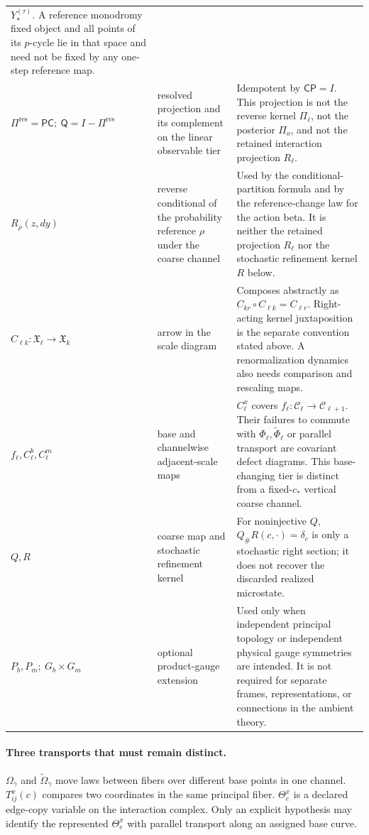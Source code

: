 \begin{longtable}{@{}>{\raggedright\arraybackslash}p{}
>{\raggedright\arraybackslash}p{}
>{\raggedright\arraybackslash}p{}@{}}
\(Y_\star^{(\tau)}\).  A reference monodromy fixed object and all points of
its \(p\)-cycle lie in that space and need not be fixed by any one-step
reference map. \\
\(\Pi^{\mathrm{res}}=\mathsf P\mathsf C;\ \mathsf Q=I-\Pi^{\mathrm{res}}\) &
resolved projection and its complement on the linear observable tier &
Idempotent by \(\mathsf C\mathsf P=I\).  This projection is not the reverse
kernel \(\Pi_\ell\), not the posterior \(\Pi_o\), and not the retained
interaction projection \(R_\ell\). \\
\(R_\rho(z,dy)\) &
reverse conditional of the probability reference \(\rho\) under the coarse
channel &
Used by the conditional-partition formula and by the reference-change law for
the action beta.  It is neither the retained projection \(R_\ell\) nor the
stochastic refinement kernel \(R\) below. \\
\(C_{\ell k}:\mathfrak X_\ell\to\mathfrak X_k\) &
arrow in the scale diagram &
Composes abstractly as \(C_{kr}\circ C_{\ell k}=C_{\ell r}\).  Right-acting
kernel juxtaposition is the separate convention stated above.  A renormalization dynamics
also needs comparison and rescaling maps. \\
\(f_\ell,C_\ell^b,C_\ell^m\) &
base and channelwise adjacent-scale maps &
\(C_\ell^x\) covers \(f_\ell:\mathcal C_\ell\to\mathcal C_{\ell+1}\). Their failures to commute with
\(\Phi_\ell,\widetilde\Phi_\ell\) or parallel transport are covariant
defect diagrams. This base-changing tier is distinct from a fixed-\(c_*\)
vertical coarse channel. \\
\(Q,R\) &
coarse map and stochastic refinement kernel &
For noninjective \(Q\), \(Q_\#R(c,\cdot)=\delta_c\) is only a stochastic
right section; it does not recover the discarded realized microstate. \\
\(P_b,P_m;\ G_b\times G_m\) &
optional product-gauge extension &
Used only when independent principal topology or independent physical gauge
symmetries are intended. It is not required for separate frames,
representations, or connections in the ambient theory. \\
\bottomrule
\end{longtable}

\paragraph{Three transports that must remain distinct.}
\(\Omega_\gamma\) and \(\widetilde\Omega_\gamma\) move laws between fibers
over different base points in one channel. \(T_{ij}^x(c)\) compares two
coordinates in the same principal fiber. \(\Theta_e^x\) is a declared
edge-copy variable on the interaction complex. Only an explicit hypothesis
may identify the represented \(\Theta_e^x\) with parallel transport along
an assigned base curve.

